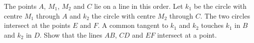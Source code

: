 The points $A$, $M_1$, $M_2$ and $C$ lie on a line in this order.
Let $k_1$ be the circle with centre $M_1$ through $A$ and $k_2$ the circle
with centre $M_2$ through $C$. The two circles intersect at the points $E$ and $F$.
A common tangent to $k_1$ and $k_2$ touches $k_1$ in $B$ and $k_2$ in $D$.
Show that the lines $AB$, $CD$ and $EF$ intersect at a point.